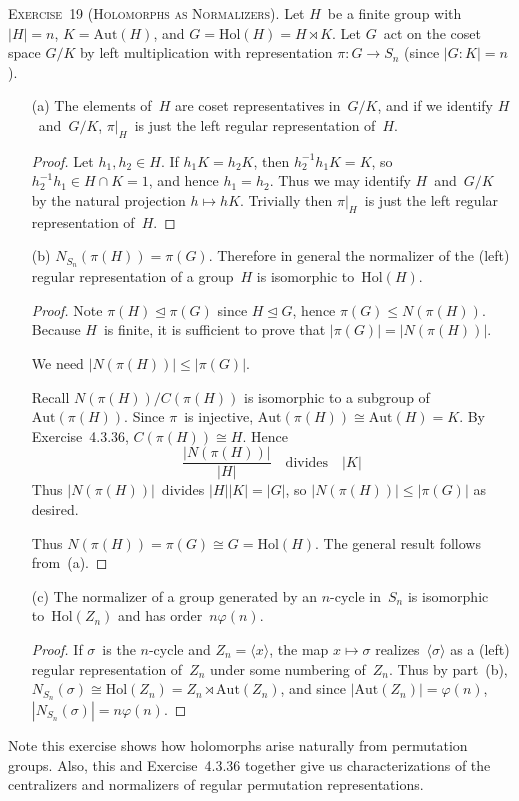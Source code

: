 \documentclass[letterpaper]{article}
\newcommand{\exercise}[1]{\goodbreak\noindent\textsc{Exercise~{#1}.}}
\newcommand{\iso}{\cong}
\newcommand{\sect}{\cap}
\newcommand{\subgroup}{\le}
\newcommand{\normal}{\trianglelefteq}
\newcommand{\aut}{\mathrm{Aut}}
\newcommand{\hol}{\mathrm{Hol}}
\newcommand{\ord}[1]{|{#1}|}
\newcommand{\gen}[1]{\langle{#1}\rangle}
\newcommand{\gindex}[2]{|{#1}:{#2}|}
\begin{document}
\exercise{19 (Holomorphs as Normalizers)}
Let $H$~be a finite group with $\ord{H}=n$, $K=\aut(H)$, and $G=\hol(H)=H\rtimes K$. Let $G$~act on the coset space $G/K$ by left multiplication with representation $\pi:G\to S_n$ (since $\gindex{G}{K}=n$).
\begin{enumerate}[itemsep=0pt]
\item[(a)] The elements of~$H$ are coset representatives in~$G/K$, and if we identify $H$~and~$G/K$, $\pi|_H$~is just the left regular representation of~$H$.
\begin{proof}
Let $h_1,h_2\in H$. If $h_1K=h_2K$, then $h_2^{-1}h_1K=K$, so $h_2^{-1}h_1\in H\sect K=1$, and hence $h_1=h_2$. Thus we may identify $H$~and~$G/K$ by the natural projection $h\mapsto hK$. Trivially then $\pi|_H$~is just the left regular representation of~$H$.
\end{proof}
\item[(b)] $N_{S_n}(\pi(H))=\pi(G)$. Therefore in general the normalizer of the (left) regular representation of a group~$H$ is isomorphic to~$\hol(H)$.
\begin{proof}
Note $\pi(H)\normal\pi(G)$ since $H\normal G$, hence $\pi(G)\subgroup N(\pi(H))$. Because $H$~is finite, it is sufficient to prove that $\ord{\pi(G)}=\ord{N(\pi(H))}$.

We need $\ord{N(\pi(H))}\le\ord{\pi(G)}$.

Recall $N(\pi(H))/C(\pi(H))$ is isomorphic to a subgroup of~$\aut(\pi(H))$. Since $\pi$~is injective, $\aut(\pi(H))\iso\aut(H)=K$. By Exercise~4.3.36, $C(\pi(H))\iso H$. Hence
$$\frac{\ord{N(\pi(H))}}{\ord{H}}\quad\text{divides}\quad\ord{K}$$
Thus $\ord{N(\pi(H))}$~divides $\ord{H}\ord{K}=\ord{G}$, so $\ord{N(\pi(H))}\le\ord{\pi(G)}$ as desired.

Thus $N(\pi(H))=\pi(G)\iso G=\hol(H)$. The general result follows from~(a).
\end{proof}
\item[(c)] The normalizer of a group generated by an $n$-cycle in~$S_n$ is isomorphic to~$\hol(Z_n)$ and has order~$n\varphi(n)$.
\begin{proof}
If $\sigma$~is the $n$-cycle and $Z_n=\gen{x}$, the map $x\mapsto\sigma$ realizes~$\gen{\sigma}$ as a (left) regular representation of~$Z_n$ under some numbering of~$Z_n$. Thus by part~(b), $N_{S_n}(\sigma)\iso\hol(Z_n)=Z_n\rtimes\aut(Z_n)$, and since $\ord{\aut(Z_n)}=\varphi(n)$, $\ord{N_{S_n}(\sigma)}=n\varphi(n)$.
\end{proof}
\end{enumerate}
\noindent Note this exercise shows how holomorphs arise naturally from permutation groups. Also, this and Exercise~4.3.36 together give us characterizations of the centralizers and normalizers of regular permutation representations.
\end{document}
